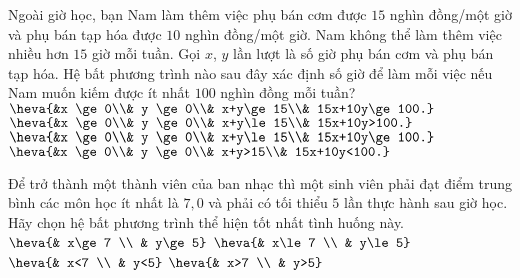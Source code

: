 \begin{ex}%
	Ngoài giờ học, bạn Nam làm thêm việc phụ bán cơm được $15$ nghìn đồng/một giờ và phụ bán tạp hóa được $10$ nghìn đồng/một giờ. Nam không thể làm thêm việc nhiều hơn $15$ giờ mỗi tuần. Gọi $x$, $y$ lần lượt là số giờ phụ bán cơm và phụ bán tạp hóa. Hệ bất phương trình nào sau đây xác định số giờ để làm mỗi việc nếu Nam muốn kiếm được ít nhất $100$ nghìn đồng mỗi tuần?
	\def\dotEX{}
	\choice
	{$\heva{&x \ge 0\\& y \ge 0\\& x+y\ge 15\\& 15x+10y\ge 100.}$}
	{$\heva{&x \ge 0\\& y \ge 0\\& x+y\le 15\\& 15x+10y>100.}$}
	{\True $\heva{&x \ge 0\\& y \ge 0\\& x+y\le 15\\& 15x+10y\ge 100.}$}
	{$\heva{&x \ge 0\\& y \ge 0\\& x+y>15\\& 15x+10y<100.}$}
\end{ex}

\begin{ex}%
	Để trở thành một thành viên của ban nhạc thì một sinh viên phải đạt điểm trung bình các môn học ít nhất là $7,0$ và phải có tối thiểu $5$ lần thực hành sau giờ học. Hãy chọn hệ bất phương trình thể hiện tốt nhất tình huống này.
	\choice
	{\True $\heva{& x\ge 7 \\ & y\ge 5}$}
	{$\heva{& x\le 7 \\ & y\le 5}$}
	{$\heva{& x<7 \\ & y<5}$}
	{$\heva{& x>7 \\ & y>5}$}
	\loigiai{
	}
\end{ex}

